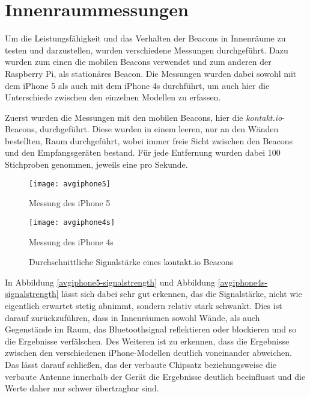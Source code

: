 \section{Innenraummessungen}
\label{sec:dataandmeasurement:indoormeasure}
Um die Leistungsfähigkeit und das Verhalten der Beacons in Innenräume zu testen und darzustellen, wurden verschiedene Messungen durchgeführt. Dazu wurden zum einen die mobilen Beacons verwendet und zum anderen der Raspberry Pi, als stationäres Beacon.
Die Messungen wurden dabei sowohl mit dem iPhone 5 als auch mit dem iPhone 4s durchführt, um auch hier die Unterschiede zwischen den einzelnen Modellen zu erfassen.


Zuerst wurden die Messungen mit den mobilen Beacons, hier die \emph{kontakt.io}-Beacons, durchgeführt.
Diese wurden in einem leeren, nur an den Wänden bestellten, Raum durchgeführt, wobei immer freie Sicht zwischen den Beacons und den Empfangsgeräten bestand. Für jede Entfernung wurden dabei 100 Stichproben genommen, jeweils eine pro Sekunde.
\begin{figure}[h!]
	\centering
	\begin{minipage}[t]{5cm}
		\texttt{[image: avgiphone5]}
		\caption{Messung des iPhone 5}
		\label{avgiphone5-signalstrength}
	\end{minipage}
	\hspace{2cm}
	\begin{minipage}[t]{5cm}
			\texttt{[image: avgiphone4s]}
			\caption{Messung des iPhone 4s}
			\label{avgiphone4s-signalstrength}
	\end{minipage}
		\caption{Durchschnittliche Signalstärke eines kontakt.io Beacons}
		\label{signalstrength}
\end{figure}

In Abbildung \ref{avgiphone5-signalstrength} und Abbildung \ref{avgiphone4s-signalstrength} lässt sich dabei sehr gut erkennen, das die Signalstärke, nicht wie eigentlich erwartet stetig abnimmt, sondern relativ stark schwankt. Dies ist darauf zurückzuführen, dass in Innenräumen sowohl Wände, als auch Gegenstände im Raum, das Bluetoothsignal reflektieren oder blockieren und so die Ergebnisse verfälschen.
Des Weiteren ist zu erkennen, dass die Ergebnisse zwischen den verschiedenen iPhone-Modellen deutlich voneinander abweichen. Das lässt darauf schließen, das der verbaute Chipsatz beziehungsweise die verbaute Antenne innerhalb der Gerät die Ergebnisse deutlich beeinflusst und die Werte daher nur schwer übertragbar sind.


